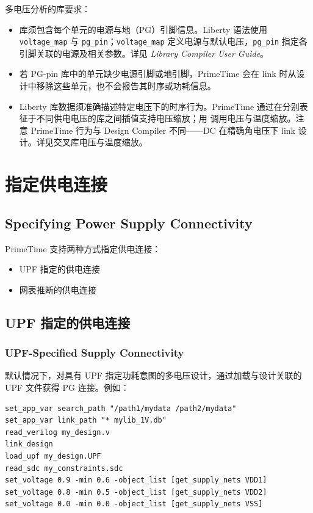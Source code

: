 多电压分析的库要求：
\begin{itemize}
  \item 库须包含每个单元的电源与地（PG）引脚信息。Liberty 语法使用 \texttt{voltage\_map} 与 \texttt{pg\_pin}；\texttt{voltage\_map} 定义电源与默认电压，\texttt{pg\_pin} 指定各引脚关联的电源及相关参数。详见 \textit{Library Compiler User Guide}。
  \item 若 PG-pin 库中的单元缺少电源引脚或地引脚，PrimeTime 会在 link 时从设计中移除这些单元，也不会报告其时序或功耗信息。
  \item Liberty 库数据须准确描述特定电压下的时序行为。PrimeTime 通过在分别表征于不同供电电压的库之间插值支持电压缩放；用  调用电压与温度缩放。注意 PrimeTime 行为与 Design Compiler 不同——DC 在精确角电压下 link 设计。详见交叉库电压与温度缩放。
\end{itemize}

\section{指定供电连接}
\subsection*{Specifying Power Supply Connectivity}

PrimeTime 支持两种方式指定供电连接：
\begin{itemize}
  \item UPF 指定的供电连接
  \item 网表推断的供电连接
\end{itemize}

\subsection{UPF 指定的供电连接}
\subsubsection*{UPF-Specified Supply Connectivity}

默认情况下，对具有 UPF 指定功耗意图的多电压设计，通过加载与设计关联的 UPF 文件获得 PG 连接。例如：
\begin{lstlisting}
set_app_var search_path "/path1/mydata /path2/mydata"
set_app_var link_path "* mylib_1V.db"
read_verilog my_design.v
link_design
load_upf my_design.UPF
read_sdc my_constraints.sdc
set_voltage 0.9 -min 0.6 -object_list [get_supply_nets VDD1]
set_voltage 0.8 -min 0.5 -object_list [get_supply_nets VDD2]
set_voltage 0.0 -min 0.0 -object_list [get_supply_nets VSS]
\end{lstlisting}

